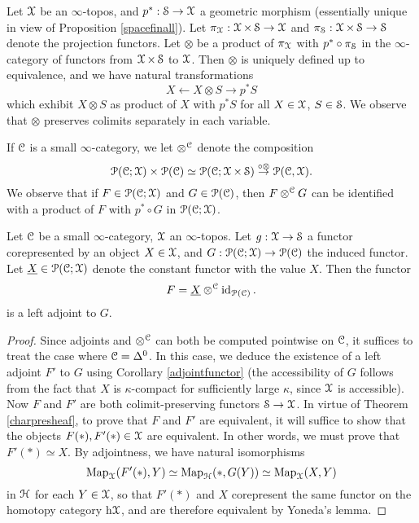 \begin{notation}
Let $\calX$ be an $\infty$-topos, and $p^{\ast}: \SSet \rightarrow \calX$ a geometric
morphism (essentially unique in view of Proposition \ref{spacefinall}). Let $\pi_{\calX}: \calX \times \SSet \rightarrow \calX$ and $\pi_{\SSet}: \calX \times \SSet \rightarrow \SSet$ denote the projection functors. Let $\otimes$ be a product of $\pi_{\calX}$ with $p^{\ast} \circ \pi_{\SSet}$ in the
$\infty$-category of functors from $\calX \times \SSet$ to $\calX$. Then $\otimes$
is uniquely defined up to equivalence, and we have natural transformations
$$ X \leftarrow X \otimes S \rightarrow p^{\ast} S$$
which exhibit $X \otimes S$ as product of $X$ with $p^{\ast} S$ for all $X \in \calX$, $S \in \SSet$.
We observe that $\otimes$ preserves colimits separately in each variable.

If $\calC$ is a small $\infty$-category, we let 
$\otimes^{\calC}$ denote the composition
$$ \calP(\calC; \calX) \times \calP(\calC) \simeq \calP(\calC; \calX \times \SSet)
\stackrel{\circ \otimes}{\rightarrow} \calP(\calC, \calX).$$
We observe that if $F \in \calP(\calC; \calX)$ and $G \in \calP(\calC)$, then
$F \otimes^{\calC} G$ can be identified with a product of $F$ with $p^{\ast} \circ G$ in
$\calP(\calC; \calX)$.
\end{notation}

\begin{lemma}\label{goldenboy}
Let $\calC$ be a small $\infty$-category, $\calX$ an $\infty$-topos. Let
$g: \calX \rightarrow \SSet$ a functor corepresented by an object $X \in \calX$,
and $G: \calP(\calC; \calX) \rightarrow \calP(\calC)$ the induced functor.
Let $\underline{X} \in \calP(\calC; \calX)$ denote the constant functor with the value $X$. Then
the functor
$$ F = \underline{X} \otimes^{\calC} \id_{ \calP(\calC)}.$$
is a left adjoint to $G$.
\end{lemma}

\begin{proof}
Since adjoints and $\otimes^{\calC}$ can both be computed pointwise on $\calC$, it suffices
to treat the case where $\calC = \Delta^0$. In this case, we deduce the existence of a left adjoint
$F'$ to $G$ using Corollary \ref{adjointfunctor} (the accessibility of $G$ follows from the fact
that $X$ is $\kappa$-compact for sufficiently large $\kappa$, since $\calX$ is accessible). Now
$F$ and $F'$ are both colimit-preserving functors $\SSet \rightarrow \calX$. In virtue of Theorem \ref{charpresheaf}, to prove that $F$ and $F'$ are equivalent, it will suffice to show that the objects
$F(\ast), F'(\ast) \in \calX$ are equivalent. In other words, we must prove that $F'(\ast) \simeq X$. By adjointness, we have natural isomorphisms
$$ \bHom_{\calX}( F'(\ast), Y) \simeq \bHom_{\calH}( \ast, G(Y)) \simeq \bHom_{\calX}(X,Y)$$
in $\calH$ for each $Y \in \calX$, so that $F'(\ast)$ and $X$ corepresent the same functor on
the homotopy category $\h{\calX}$, and are therefore equivalent by Yoneda's lemma.
\end{proof}

